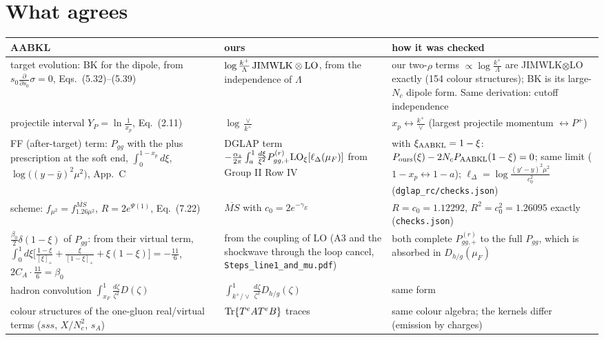 \documentclass[10pt]{article}
\numberwithin{equation}{section}
\newcommand{\JJ}{{\rm JIMWLK}\otimes{\rm LO}}
\begin{document}
\section{What agrees}\label{sec:same}
{\small\renewcommand{\arraystretch}{1.3}
\begin{longtable}{@{}>{\raggedright\arraybackslash}p{}>{\raggedright\arraybackslash}p{}>{\raggedright\arraybackslash}p{}@{}}\toprule
AABKL & ours & how it was checked\\\midrule
target evolution: BK for the dipole, from $s_0\frac{\partial}{\partial s_0}\sigma=0$, Eqs.~(5.32)--(5.39) & $\log\frac{k^+}{\Lambda}\,\JJ$, from the independence of $\Lambda$ & our two-$\rho$ terms $\propto\log\frac{k^+}{\Lambda}$ are JIMWLK$\otimes$LO exactly (154 colour structures); BK is its large-$N_c$ dipole form. Same derivation: cutoff independence\\
projectile interval $Y_P=\ln\frac1{x_p}$, Eq.~(2.11) & $\log\frac{\vee}{k^+}$ & $x_p\leftrightarrow\frac{k^+}{\vee}$ (largest projectile momentum $\leftrightarrow P^+$)\\
FF (after-target) term: $P_{gg}$ with the plus prescription at the soft end, $\int_0^{1-x_p}d\xi$, $\log\big((y-\bar y)^2\mu^2\big)$, App.~C & DGLAP term $-\frac{\alpha_s}{2\pi}\int_a^1\frac{d\xi}{\xi^2}P^{(r)}_{gg,+}{\rm LO}_\xi[\ell_\Delta(\mu_F)]$ from Group II Row IV & with $\xi_{\rm AABKL}=1-\xi$: $P_{\rm ours}(\xi)-2N_cP_{\rm AABKL}(1-\xi)=0$; same limit ($1-x_p\leftrightarrow1-a$); $\ell_\Delta=\log\frac{(y'-y)^2\mu^2}{c_0^2}$ (\texttt{dglap\_rc/checks.json})\\
scheme: $f_{\mu^2}=f^{\overline{MS}}_{1.26\mu^2}$, $R=2e^{\Psi(1)}$, Eq.~(7.22) & $\overline{MS}$ with $c_0=2e^{-\gamma_E}$ & $R=c_0=1.12292$, $R^2=c_0^2=1.26095$ exactly (\texttt{checks.json})\\
$\frac{\beta_0}{2}\delta(1-\xi)$ of $P_{gg}$: from their virtual term, $\int_0^1d\xi\big[\frac{1-\xi}{[\xi]_+}+\frac{\xi}{[1-\xi]_+}+\xi(1-\xi)\big]=-\frac{11}{6}$, $2C_A\cdot\frac{11}{6}=\beta_0$ & from the coupling of LO (A3 and the shockwave through the loop cancel, \texttt{Steps\_line1\_and\_mu.pdf}) & both complete $P^{(r)}_{gg,+}$ to the full $P_{gg}$, which is absorbed in $D_{h/g}(\mu_F)$\\
hadron convolution $\int_{x_F}^1\frac{d\zeta}{\zeta^2}D(\zeta)$ & $\int_{k^+/\vee}^1\frac{d\zeta}{\zeta^3}D_{h/g}(\zeta)$ & same form\\
colour structures of the one-gluon real/virtual terms ($sss$, $X/N_c^2$, $s_A$) & ${\rm Tr}\{T^eAT^eB\}$ traces & same colour algebra; the kernels differ (emission by charges)\\\bottomrule
\end{longtable}}
\end{document}
